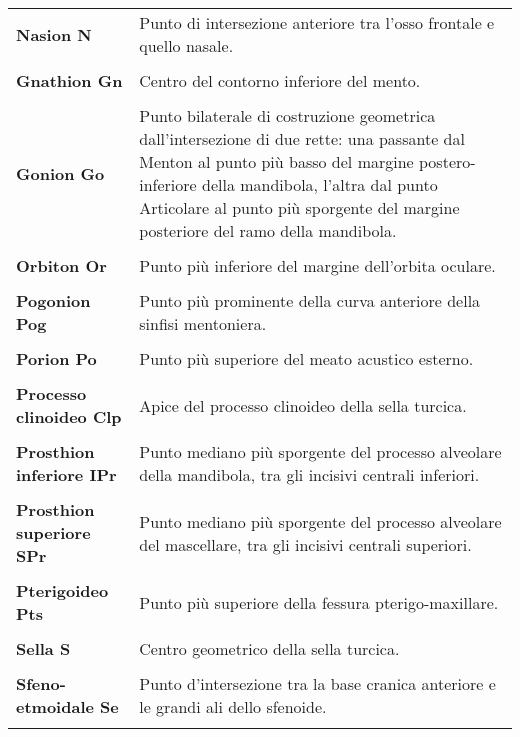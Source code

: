 \begin{longtable}{>{\bfseries}p{5cm}X}
Nasion \newline N & Punto di intersezione anteriore tra l'osso frontale e quello nasale.\\\\
Gnathion \newline Gn & Centro del contorno inferiore del mento.\\\\
Gonion \newline Go & Punto bilaterale di costruzione geometrica dall'intersezione di due rette: una passante dal Menton al punto più basso del margine postero-inferiore della mandibola, l'altra dal punto Articolare al punto più sporgente del margine posteriore del ramo della mandibola.\\\\
Orbiton \newline Or & Punto più inferiore del margine dell'orbita oculare.\\\\
Pogonion \newline Pog & Punto più prominente della curva anteriore della sinfisi mentoniera.\\\\
Porion \newline Po & Punto più superiore del meato acustico esterno.\\\\
Processo clinoideo \newline Clp & Apice del processo clinoideo della sella turcica.\\\\
Prosthion inferiore \newline IPr & Punto mediano più sporgente del processo alveolare della mandibola, tra gli incisivi centrali inferiori.\\\\
Prosthion superiore \newline SPr & Punto mediano più sporgente del processo alveolare del mascellare, tra gli incisivi centrali superiori.\\\\
Pterigoideo \newline Pts & Punto più superiore della fessura pterigo-maxillare.\\\\
Sella \newline S & Centro geometrico della sella turcica.\\\\
Sfeno-etmoidale \newline Se & Punto d'intersezione tra la base cranica anteriore e le grandi ali dello sfenoide.\\\\

\end{longtable}
